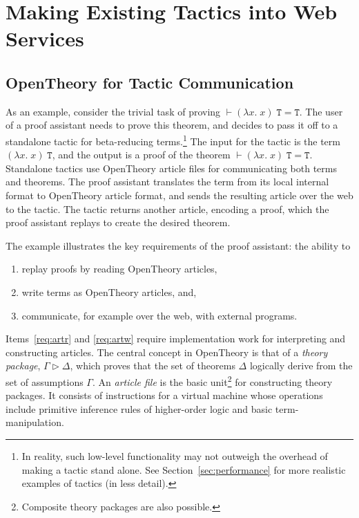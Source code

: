 \documentclass{llncs}
\newcommand{\OpenTheory}{OpenTheory\xspace}
\newcommand{\secref}[1]{Section~\ref{sec:#1}}
\begin{document}
\section{Making Existing Tactics into Web Services}
\label{sec:implementation}

\subsection{\OpenTheory for Tactic Communication}
As an example, consider the trivial task of proving $\vdash(\lambda{x}.\;x)\;\mathtt{T}=\mathtt{T}$.
The user of a proof assistant needs to prove this theorem, and decides to pass it off to a standalone tactic for beta-reducing terms.\footnote{In reality, such low-level functionality may not outweigh the overhead of making a tactic stand alone. See \secref{performance} for more realistic examples of tactics (in less detail).}
The input for the tactic is the term $(\lambda{x}.\;x)\;\mathtt{T}$, and the output is a proof of the theorem $\vdash(\lambda{x}.\;x)\;\mathtt{T}=\mathtt{T}$.
Standalone tactics use \OpenTheory article files for communicating both terms and theorems.
The proof assistant translates the term from its local internal format to \OpenTheory article format, and sends the resulting article over the web to the tactic.
The tactic returns another article, encoding a proof, which the proof assistant replays to create the desired theorem.

The example illustrates the key requirements of the proof assistant: the ability to
\begin{enumerate}
\item \label{req:artr} replay proofs by reading \OpenTheory articles,
\item \label{req:artw} write terms as \OpenTheory articles, and,
\item \label{req:comm} communicate, for example over the web, with external programs.
\end{enumerate}

Items~\ref{req:artr} and \ref{req:artw} require implementation work for interpreting and constructing articles.
The central concept in \OpenTheory is that of a \emph{theory package}, $\Gamma\rhd\Delta$, which proves that the set of theorems $\Delta$ logically derive from the set of assumptions $\Gamma$.
An \emph{article file} is the basic unit\footnote{Composite theory packages are also possible.} for constructing theory packages.
It consists of instructions for a virtual machine whose operations include primitive inference rules of higher-order logic and basic term-manipulation.
\end{document}
